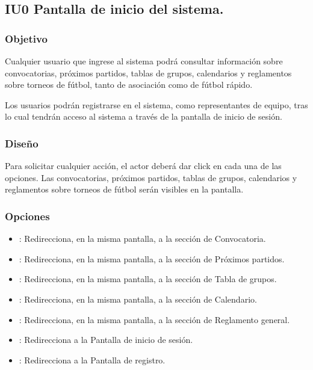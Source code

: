 \subsection{IU0 Pantalla de inicio del sistema.}

\subsubsection{Objetivo}
	Cualquier usuario que ingrese al sistema podrá consultar información sobre convocatorias, próximos partidos, tablas de grupos, calendarios y reglamentos sobre torneos de fútbol, tanto de asociación como de fútbol rápido.

Los usuarios podrán registrarse en el sistema, como representantes de equipo, tras lo cual tendrán acceso al sistema a través de la pantalla de inicio de sesión.
\subsubsection{Diseño}
  Para solicitar cualquier acción, el actor deberá dar click en cada una de las opciones.
  Las convocatorias, próximos partidos, tablas de grupos, calendarios y reglamentos sobre torneos de fútbol serán visibles en la pantalla.



\subsubsection{Opciones}
\begin{itemize}
	\item {}: Redirecciona, en la misma pantalla, a la sección de Convocatoria.
  \item {}: Redirecciona, en la misma pantalla, a la sección de Próximos partidos.
  \item {}: Redirecciona, en la misma pantalla, a la sección de Tabla de grupos.
  \item {}: Redirecciona, en la misma pantalla, a la sección de Calendario.
  \item {}: Redirecciona, en la misma pantalla, a la sección de Reglamento general.  
  \item {}: Redirecciona a la Pantalla de inicio de sesión.
  \item {}: Redirecciona a la Pantalla de registro.
\end{itemize}
